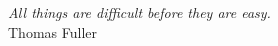 \vspace*{3cm}

\begin{flushright}{
		\slshape All things are difficult before they are easy.} \\ \medskip Thomas Fuller
\end{flushright}


%
